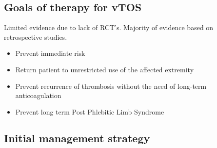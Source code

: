 \documentclass[
]{book}
\begin{document}
\hypertarget{goals-of-therapy-for-vtos}{%
\subsection{Goals of therapy for vTOS}\label{goals-of-therapy-for-vtos}}

Limited evidence due to lack of RCT's. Majority of evidence based on
retrospective studies.~

\begin{itemize}
\item
  Prevent immediate risk~
\item
  Return patient to unrestricted use of the affected extremity
\item
  Prevent recurrence of thrombosis without the need of long-term
  anticoagulation
\item
  Prevent long term Post Phlebitic Limb Syndrome
\end{itemize}

\hypertarget{initial-management-strategy}{%
\subsection{Initial management strategy}\label{initial-management-strategy}}
\end{document}
